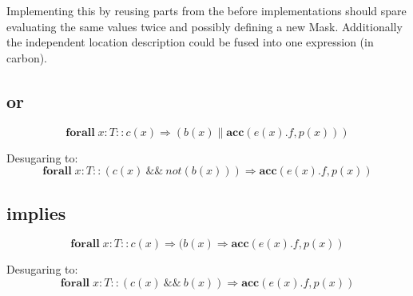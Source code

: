 \documentclass[12pt]{article}
\begin{document}
Implementing this by reusing parts from the before implementations should spare evaluating the same values twice and possibly defining a new Mask. Additionally the independent location description could be fused into one expression (in carbon).
\subsection{or}
\begin{equation}
	\mathbf{forall} \; x:T :: c(x) \Rightarrow (b(x) \| \mathbf{acc}(e(x).f, p(x) ))
\end{equation}

Desugaring to:
\begin{equation}
	\mathbf{forall} \; x:T :: (c(x) \:\&\&\: not(b(x))) \Rightarrow  \mathbf{acc}(e(x).f, p(x))
\end{equation}

\subsection{implies}
\begin{equation}
	\mathbf{forall} \; x:T :: c(x) \Rightarrow (b(x) \Rightarrow \mathbf{acc}(e(x).f, p(x))
\end{equation}

Desugaring to:
\begin{equation}
	\mathbf{forall} \; x:T ::( c(x) \:\&\&\: b(x)) \Rightarrow \mathbf{acc}(e(x).f, p(x))
\end{equation}
\end{document}
